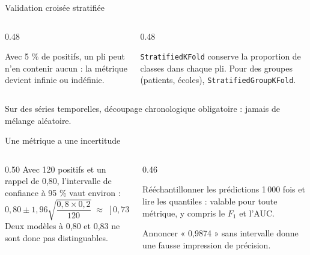 \begin{frame}{Validation croisée stratifiée}
\begin{columns}[t]
\begin{column}{0.48\textwidth}
\begin{wbox}
Avec 5 \% de positifs, un pli peut n'en contenir aucun : la métrique devient
infinie ou indéfinie.
\end{wbox}
\end{column}
\begin{column}{0.48\textwidth}
\begin{solbox}[La solution]
\texttt{StratifiedKFold} conserve la proportion de classes dans chaque pli. Pour
des groupes (patients, écoles), \texttt{StratifiedGroupKFold}.
\end{solbox}
\end{column}
\end{columns}
\vspace{2mm}
\begin{kbox}
Sur des séries temporelles, découpage chronologique obligatoire : jamais de
mélange aléatoire.
\end{kbox}
\end{frame}

\begin{frame}{Une métrique a une incertitude}
\begin{columns}[t]
\begin{column}{0.50\textwidth}
Avec 120 positifs et un rappel de 0,80, l'intervalle de confiance à 95 \%
vaut environ :
\[
  0{,}80 \pm 1{,}96\sqrt{\frac{0{,}8\times0{,}2}{120}}
  \;\approx\;[0{,}73\,;\,0{,}87].
\]
Deux modèles à 0,80 et 0,83 ne sont donc pas distinguables.
\end{column}
\begin{column}{0.46\textwidth}
\begin{kbox}[Le bootstrap]
Rééchantillonner les prédictions 1\,000 fois et lire les quantiles : valable
pour toute métrique, y compris le $F_1$ et l'AUC.
\end{kbox}
\begin{wbox}[Le piège]
Annoncer « 0,9874 » sans intervalle donne une fausse impression de précision.
\end{wbox}
\end{column}
\end{columns}
\end{frame}

